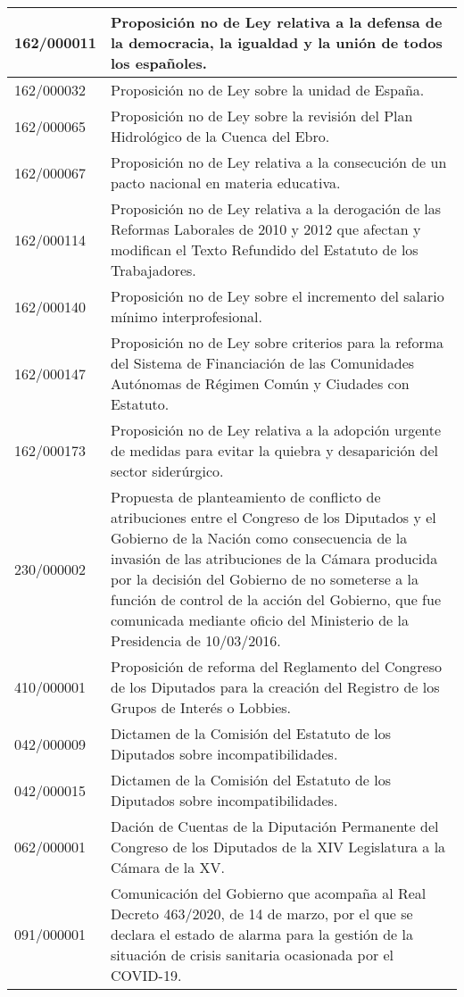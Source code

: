 {\begin{table}[H]
\begin{center}
\begin{tabularx}{\linewidth}{| l | X |}
\hline
162/000011 & Proposición no de Ley relativa a la defensa de la democracia, la igualdad y la unión de todos los españoles. \\
\hline
162/000032 & Proposición no de Ley sobre la unidad de España. \\
\hline
162/000065 & Proposición no de Ley sobre la revisión del Plan Hidrológico de la Cuenca del Ebro. \\
\hline
162/000067 & Proposición no de Ley relativa a la consecución de un pacto nacional en materia educativa. \\
\hline
162/000114 & Proposición no de Ley relativa a la derogación de las Reformas Laborales de 2010 y 2012 que afectan y modifican el Texto Refundido del Estatuto de los Trabajadores. \\
\hline
162/000140 & Proposición no de Ley sobre el incremento del salario mínimo interprofesional. \\
\hline
162/000147 & Proposición no de Ley sobre criterios para la reforma del Sistema de Financiación de las Comunidades Autónomas de Régimen Común y Ciudades con Estatuto. \\
\hline
162/000173 & Proposición no de Ley relativa a la adopción urgente de medidas para evitar la quiebra y desaparición del sector siderúrgico. \\
\hline
230/000002 & Propuesta de planteamiento de conflicto de atribuciones entre el Congreso de los Diputados y el Gobierno de la Nación como consecuencia de la invasión de las atribuciones de la Cámara producida por la decisión del Gobierno de no someterse a la función de control de la acción del Gobierno, que fue comunicada mediante oficio del Ministerio de la Presidencia de 10/03/2016. \\
\hline
410/000001 & Proposición de reforma del Reglamento del Congreso de los Diputados para la creación del Registro de los Grupos de Interés o Lobbies. \\
\hline
042/000009 & Dictamen de la Comisión del Estatuto de los Diputados sobre incompatibilidades. \\
\hline
042/000015 & Dictamen de la Comisión del Estatuto de los Diputados sobre incompatibilidades. \\
\hline
062/000001 & Dación de Cuentas de la Diputación Permanente del Congreso de los Diputados de la XIV Legislatura a la Cámara de la XV. \\
\hline
091/000001 & Comunicación del Gobierno que acompaña al Real Decreto 463/2020, de 14 de marzo, por el que se declara el estado de alarma para la gestión de la situación de crisis sanitaria ocasionada por el COVID-19. \\

\end{tabularx}
\end{center}
\end{table}}
